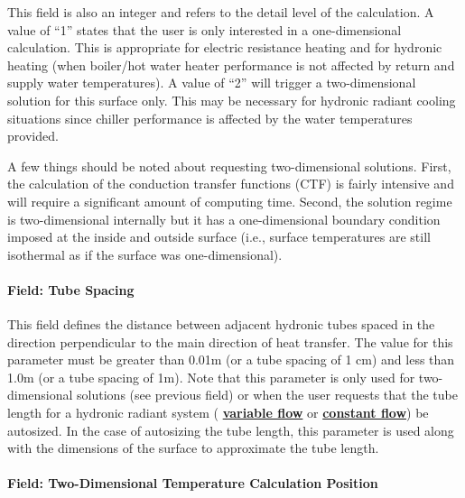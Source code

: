 This field is also an integer and refers to the detail level of the calculation. A value of ``1'' states that the user is only interested in a one-dimensional calculation. This is appropriate for electric resistance heating and for hydronic heating (when boiler/hot water heater performance is not affected by return and supply water temperatures). A value of ``2'' will trigger a two-dimensional solution for this surface only. This may be necessary for hydronic radiant cooling situations since chiller performance is affected by the water temperatures provided.

A few things should be noted about requesting two-dimensional solutions. First, the calculation of the conduction transfer functions (CTF) is fairly intensive and will require a significant amount of computing time. Second, the solution regime is two-dimensional internally but it has a one-dimensional boundary condition imposed at the inside and outside surface (i.e., surface temperatures are still isothermal as if the surface was one-dimensional).

\paragraph{Field: Tube Spacing}\label{field-tube-spacing}

This field defines the distance between adjacent hydronic tubes spaced in the direction perpendicular to the main direction of heat transfer. The value for this parameter must be greater than 0.01m (or a tube spacing of 1 cm) and less than 1.0m (or a tube spacing of 1m). Note that this parameter is only used for two-dimensional solutions (see previous field) or when the user requests that the tube length for a hydronic radiant system ( \textbf{\hyperref[zonehvaclowtemperatureradiantvariableflow]{variable flow}} or  \textbf{\hyperref[zonehvaclowtemperatureradiantconstantflow]{constant flow}}) be autosized.  In the case of autosizing the tube length, this parameter is used along with the dimensions of the surface to approximate the tube length.

\paragraph{Field: Two-Dimensional Temperature Calculation Position}\label{field-two-dimensional-temperature-calculation-position}

